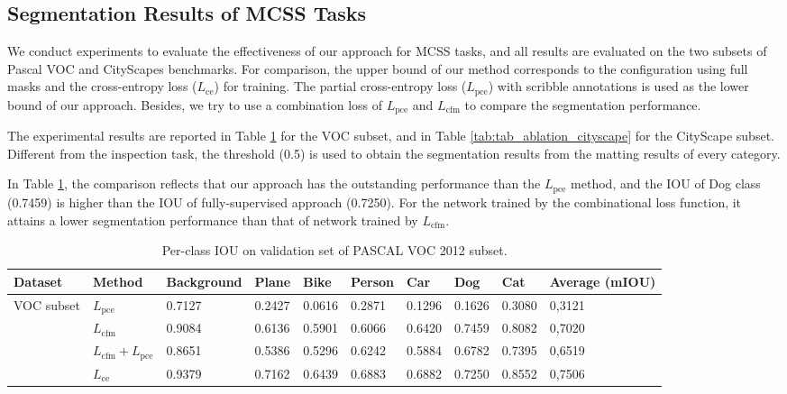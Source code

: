 \documentclass[journal]{IEEEtran}
\begin{document}
\subsection{Segmentation Results of MCSS Tasks}
\label{sec:seg_performance_mcss}
We conduct experiments to evaluate the effectiveness of our approach for MCSS tasks, and all results are evaluated on the two subsets of Pascal VOC and CityScapes benchmarks. For comparison, the upper bound of our method corresponds to the configuration using full masks and the cross-entropy loss ($L_{\text{ce}}$) for training. The partial cross-entropy loss ($L_{\text{pce}}$) with scribble annotations is used as the lower bound of our approach. Besides, we try to use a combination loss of $L_{\text{pce}}$ and $L_{\text{cfm}}$ to compare the segmentation performance.

The experimental results are reported in Table \ref{tab:tab_ablation_voc} for the VOC subset, and in Table \ref{tab:tab_ablation_cityscape} for the CityScape subset. Different from the inspection task, the threshold (0.5) is used to obtain the segmentation results from the matting results of every category. 

In Table \ref{tab:tab_ablation_voc}, the comparison reflects that our approach has the outstanding performance than the $L_{\text{pce}}$ method, and the IOU of Dog class (0.7459) is higher than the IOU of fully-supervised approach (0.7250). For the network trained by the combinational loss function, it attains a lower segmentation performance than that of network trained by $L_{\text{cfm}}$. 
\begin{table}[t]
    \centering
    \caption{Per-class IOU on validation set of PASCAL VOC 2012 subset.}
    \label{tab:tab_ablation_voc}
    \begin{tabular}{p{1.2cm}|p{1.5cm}|p{1.4cm}p{1cm}p{1cm}p{1cm}p{1cm}p{1cm}p{1cm}|p{1.5cm}}
        \toprule
        \textbf{Dataset} & \textbf{Method} & \textbf{Background} &\textbf{Plane} & \textbf{Bike} & \textbf{Person} & \textbf{Car} & \textbf{Dog} & \textbf{Cat} & \textbf{Average (mIOU)} \\
        \midrule %
        \multirow{3}{1.2cm}{VOC subset}
        & $L_{\text{pce}}$                      & 0.7127       & 0.2427       & 0.0616   & 0.2871   & 0.1296   & 0.1626   & 0.3080   & 0,3121            \\
        & $L_{\text{cfm}}$                      & 0.9084       & 0.6136       & 0.5901   & 0.6066   & 0.6420   & 0.7459   & 0.8082   & 0,7020            \\
        & $L_{\text{cfm}}+L_{\text{pce}}$       & 0.8651       & 0.5386       & 0.5296   & 0.6242   & 0.5884   & 0.6782   & 0.7395   & 0,6519            \\
        & $L_{\text{ce}}$                       & 0.9379       & 0.7162       & 0.6439   & 0.6883   & 0.6882   & 0.7250   & 0.8552   & 0,7506            \\
        \bottomrule
    \end{tabular}
\end{table}
\end{document}
